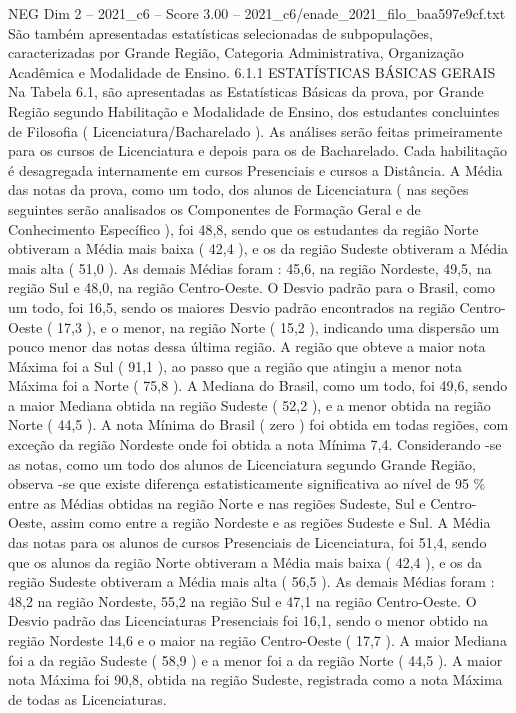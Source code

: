\begin{textsample}{NEG Dim 2 – 2021\_c6 – Score 3.00 – 2021\_c6/enade\_2021\_filo\_baa597e9cf.txt}
São também apresentadas estatísticas selecionadas de subpopulações, caracterizadas por Grande Região, Categoria Administrativa, Organização Acadêmica e Modalidade de Ensino. 6.1.1 ESTATÍSTICAS BÁSICAS GERAIS Na Tabela 6.1, são apresentadas as Estatísticas Básicas da prova, por Grande Região segundo Habilitação e Modalidade de Ensino, dos estudantes concluintes de Filosofia ( Licenciatura/Bacharelado ).
As análises serão feitas primeiramente para os cursos de Licenciatura e depois para os de Bacharelado.
Cada habilitação é desagregada internamente em cursos Presenciais e cursos a Distância.
A Média das notas da prova, como um todo, dos alunos de Licenciatura ( nas seções seguintes serão analisados os Componentes de Formação Geral e de Conhecimento Específico ), foi 48,8, sendo que os estudantes da região Norte obtiveram a Média mais baixa ( 42,4 ), e os da região Sudeste obtiveram a Média mais alta ( 51,0 ).
As demais Médias foram : 45,6, na região Nordeste, 49,5, na região Sul e 48,0, na região Centro-Oeste.
O Desvio padrão para o Brasil, como um todo, foi 16,5, sendo os maiores Desvio padrão encontrados na região Centro-Oeste ( 17,3 ), e o menor, na região Norte ( 15,2 ), indicando uma dispersão um pouco menor das notas dessa última região.
A região que obteve a maior nota Máxima foi a Sul ( 91,1 ), ao passo que a região que atingiu a menor nota Máxima foi a Norte ( 75,8 ).
A Mediana do Brasil, como um todo, foi 49,6, sendo a maior Mediana obtida na região Sudeste ( 52,2 ), e a menor obtida na região Norte ( 44,5 ).
A nota Mínima do Brasil ( zero ) foi obtida em todas regiões, com exceção da região Nordeste onde foi obtida a nota Mínima 7,4.
Considerando -se as notas, como um todo dos alunos de Licenciatura segundo Grande Região, observa -se que existe diferença estatisticamente significativa ao nível de 95 \% entre as Médias obtidas na região Norte e nas regiões Sudeste, Sul e Centro-Oeste, assim como entre a região Nordeste e as regiões Sudeste e Sul.
A Média das notas para os alunos de cursos Presenciais de Licenciatura, foi 51,4, sendo que os alunos da região Norte obtiveram a Média mais baixa ( 42,4 ), e os da região Sudeste obtiveram a Média mais alta ( 56,5 ).
As demais Médias foram : 48,2 na região Nordeste, 55,2 na região Sul e 47,1 na região Centro-Oeste.
O Desvio padrão das Licenciaturas Presenciais foi 16,1, sendo o menor obtido na região Nordeste 14,6 e o maior na região Centro-Oeste ( 17,7 ).
A maior Mediana foi a da região Sudeste ( 58,9 ) e a menor foi a da região Norte ( 44,5 ).
A maior nota Máxima foi 90,8, obtida na região Sudeste, registrada como a nota Máxima de todas as Licenciaturas.

\end{textsample}
